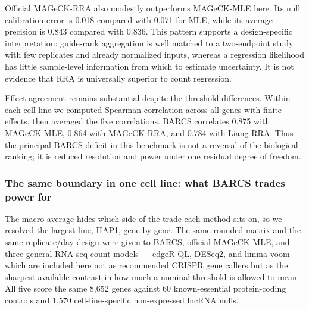 Official MAGeCK-RRA also modestly outperforms MAGeCK-MLE here.  Its null
calibration error is 0.018 compared with 0.071 for MLE, while its average
precision is 0.843 compared with 0.836.  This pattern supports a
design-specific interpretation: guide-rank aggregation is well matched to a
two-endpoint study with few replicates and already normalized inputs, whereas
a regression likelihood has little sample-level information from which to
estimate uncertainty.  It is not evidence that RRA is universally superior
to count regression.

Effect agreement remains substantial despite the threshold differences.
Within each cell line we computed Spearman correlation across all genes with
finite effects, then averaged the five correlations.  BARCS correlates 0.875
with MAGeCK-MLE, 0.864 with MAGeCK-RRA, and 0.784 with Liang RRA.  Thus the
principal BARCS deficit in this benchmark is not a reversal of the biological
ranking; it is reduced resolution and power under one residual degree of
freedom.

\subsubsection{The same boundary in one cell line: what BARCS trades power
for}

The macro average hides which side of the trade each method sits on, so we
resolved the largest line, HAP1, gene by gene.  The same rounded matrix and
the same replicate/day design were given to BARCS, official MAGeCK-MLE, and
three general RNA-seq count models --- edgeR-QL, DESeq2, and limma-voom ---
which are included here not as recommended CRISPR gene callers but as the
sharpest available contrast in how much a nominal threshold is allowed to
mean.  All five score the same 8,652 genes against 60 known-essential
protein-coding controls and 1,570 cell-line-specific non-expressed lncRNA
nulls.

